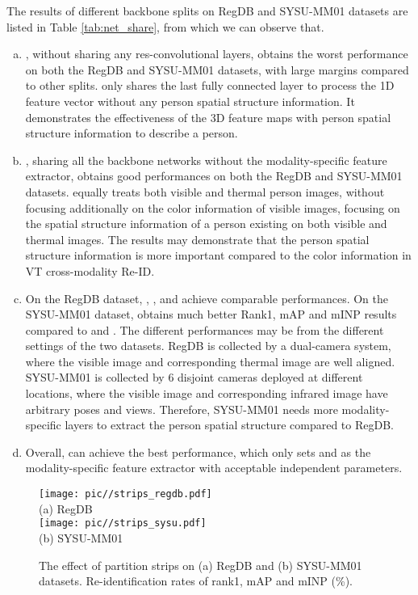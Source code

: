 \documentclass[journal]{IEEEtran}
\begin{document}
The results of different backbone splits on RegDB and SYSU-MM01 datasets are listed in Table \ref{tab:net_share}, from which we can observe that.
\begin{enumerate}[a)]
  \item , without sharing any res-convolutional layers, obtains the worst performance on both the RegDB and SYSU-MM01 datasets, with large margins compared to other splits.  only shares the last fully connected layer to process the 1D feature vector without any person spatial structure information. It demonstrates the effectiveness of the 3D feature maps with person spatial structure information to describe a person.
  \item , sharing all the backbone networks without the modality-specific feature extractor, obtains good performances on both the RegDB and SYSU-MM01 datasets.  equally treats both visible and thermal person images, without focusing additionally on the color information of visible images, focusing on the spatial structure information of a person existing on both visible and thermal images. The results may demonstrate that the person spatial structure information is more important compared to the color information in VT cross-modality Re-ID.
  \item On the RegDB dataset, , ,  and  achieve comparable performances. On the SYSU-MM01 dataset,  obtains much better Rank1, mAP and mINP results compared to  and . The different performances may be from the different settings of the two datasets. RegDB is collected by a dual-camera system, where the visible image and corresponding thermal image are well aligned. SYSU-MM01 is collected by 6 disjoint cameras deployed at different locations, where the visible image and corresponding infrared image have arbitrary poses and views. Therefore, SYSU-MM01 needs more modality-specific layers to extract the person spatial structure compared to RegDB.
  \item Overall,  can achieve the best performance, which only sets  and  as the modality-specific feature extractor with acceptable independent parameters.
\end{enumerate}

\begin{figure}
\centering
\texttt{[image: pic//strips\_regdb.pdf]} \\ (a) RegDB \\
\texttt{[image: pic//strips\_sysu.pdf]} \\  (b) SYSU-MM01
\caption{The effect of partition strips  on (a) RegDB and (b) SYSU-MM01 datasets. Re-identification rates of rank1, mAP and mINP (\%).}
\label{fig:strips}
\end{figure}
\end{document}
